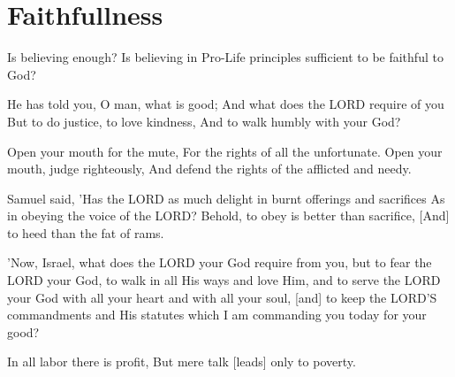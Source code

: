 \chapter{Faithfullness}

Is believing enough? Is believing in Pro-Life principles sufficient to be faithful to God?

\begin{scripture}[Micah 6:8]
    He has told you, O man, what is good; And what does the LORD require of you But to do justice, to love kindness, And to walk humbly with your God?
\end{scripture}

\vspace{2\baselineskip}

\begin{scripture}[Proverbs 31:8-9]
    Open your mouth for the mute, For the rights of all the unfortunate.
    Open your mouth, judge righteously, And defend the rights of the afflicted and needy.
\end{scripture}

\vspace{2\baselineskip}

\begin{scripture}[1 Samuel 15:22]
    Samuel said, 'Has the LORD as much delight in burnt offerings and sacrifices As in obeying the voice of the LORD? Behold, to obey is better than sacrifice, [And] to heed than the fat of rams.
\end{scripture}

\vspace{2\baselineskip}

\begin{scripture}[Deuteronomy 10:12-13]
    'Now, Israel, what does the LORD your God require from you, but to fear the LORD your God, to walk in all His ways and love Him, and to serve the LORD your God with all your heart and with all your soul,
    [and] to keep the LORD'S commandments and His statutes which I am commanding you today for your good?
\end{scripture}

\vspace{2\baselineskip}

\begin{scripture}[Proverbs 14:23]
    In all labor there is profit, But mere talk [leads] only to poverty.
\end{scripture}

\vspace{2\baselineskip}

